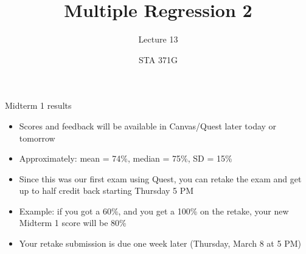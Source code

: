 \documentclass{beamer}\usepackage[]{graphicx}\usepackage[]{color}
\title{Multiple Regression 2}
\subtitle{Lecture 13}
\author{STA 371G}
\begin{document}
  
  
  

  \frame{\maketitle}



  \begin{darkframes}
    \begin{frame}{Midterm 1 results}
      \begin{itemize}[<+->]
        \item Scores and feedback will be available in Canvas/Quest later today or tomorrow
        \item Approximately: mean = 74\%, median = 75\%, SD = 15\%
        \item Since this was our first exam using Quest, you can retake the exam and get up to half credit back starting Thursday 5 PM
        \item Example: if you got a 60\%, and you get a 100\% on the retake, your new Midterm 1 score will be 80\%
        \item Your retake submission is due one week later (Thursday, March 8 at 5 PM)
      \end{itemize}
    \end{frame}


\end{darkframes}
\end{document}
